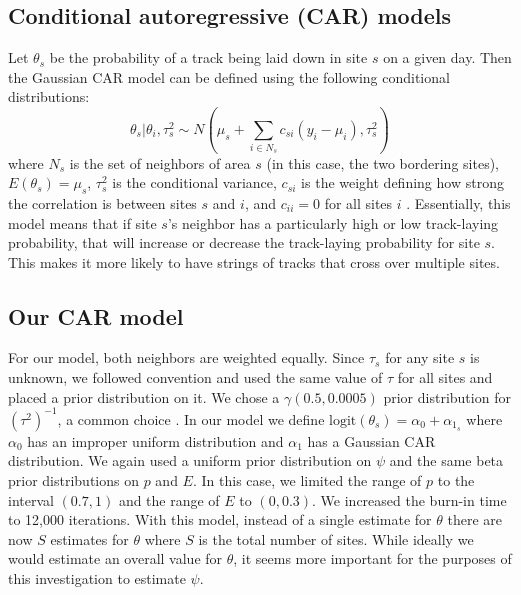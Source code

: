 \documentclass[12pt]{article}
\begin{document}
    \subsection{Conditional autoregressive (CAR) models}
    Let $\theta_s$ be the probability of a track being laid down in site $s$ on
    a given day. Then the Gaussian CAR model can be defined using the following
    conditional distributions:
    \begin{equation}
        \theta_s|\theta_i,\tau_s^2 \sim N(\mu_s+\sum_{i\in N_s}
        c_{si}(y_i-\mu_i),\tau_s^2)
    \end{equation}
    where $N_s$ is the set of neighbors of area $s$ (in this case, the two
    bordering sites), $E(\theta_s)=\mu_s$, $\tau_s^2$ is the conditional
    variance, $c_{si}$ is the weight defining how strong the correlation is
    between sites $s$ and $i$, and $c_{ii}=0$ for all sites $i$ \cite{Arab2008}.
    Essentially, this model means that if site $s$'s neighbor has a
    particularly high or low track-laying probability, that will increase or
    decrease the track-laying probability for site $s$. This makes it more
    likely to have strings of tracks that cross over multiple sites.

    \subsection{Our CAR model}
    \label{car model}
    For our model, both neighbors are weighted equally. Since $\tau_s$ for any
    site $s$ is unknown, we followed convention and used the same value of
    $\tau$ for all sites and placed a prior distribution on it. We chose a
    $\gamma(0.5,0.0005)$ prior distribution for $(\tau^2)^{-1}$, a common choice
    \cite{Thomas2004}. In our model we define $\text{logit}(\theta_s)=\alpha_0+
    \alpha_{1_s}$ where $\alpha_0$ has an improper uniform distribution and
    $\alpha_1$ has a Gaussian CAR distribution. We again used a uniform prior
    distribution on $\psi$ and the same beta prior distributions on $p$ and $E$.
    In this case, we limited the range of $p$ to the interval $(0.7,1)$ and the
    range of $E$ to $(0,0.3)$. We increased the burn-in time to 12,000
    iterations. With this model, instead of a single estimate for $\theta$ there
    are now $S$ estimates for $\theta$ where $S$ is the total number of sites.
    While ideally we would estimate an overall value for $\theta$, it seems more
    important for the purposes of this investigation to estimate $\psi$.
\end{document}

